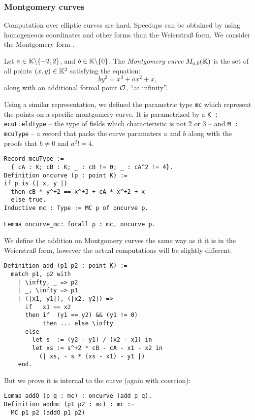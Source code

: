 \subsubsection{Montgomery curves}
\label{montgomery}
Computation over elliptic curves are hard. Speedups can be obtained by using
homogeneous coordinates and other forms than the Weierstra{\ss} form. We consider
the Montgomery form \cite{MontgomerySpeeding}.

\begin{definition}
  Let $a \in \mathbb{K} \backslash \{-2, 2\}$, and $b \in \mathbb{K} \backslash \{ 0\}$. The \textit{Montgomery curve} $M_{a,b}(\mathbb{K})$ is the set of all points $(x,y) \in \mathbb{K}^2$ satisfying the equation:
  $$by^2 = x^3 + ax^2 + x,$$
  along with an additional formal point $\mathcal{O}$, ``at infinity''.
\end{definition}

Using a similar representation, we defined the parametric type \texttt{mc} which
represent the points on a specific montgomery curve. It is parametrized by
a \texttt{K : ecuFieldType} -- the type of fields which characteristic is not 2 or 3 --
and \texttt{M : mcuType} -- a record that packs the curve paramaters $a$ and $b$
along with the proofs that $b \neq 0$ and $a^2 != 4$.
\begin{lstlisting}[language=Coq]
Record mcuType :=
  { cA : K; cB : K; _ : cB != 0; _ : cA^2 != 4}.
Definition oncurve (p : point K) :=
if p is (| x, y |)
  then cB * y^+2 == x^+3 + cA * x^+2 + x
  else true.
Inductive mc : Type := MC p of oncurve p.

Lemma oncurve_mc: forall p : mc, oncurve p.
\end{lstlisting}

We define the addition on Montgomery curves the same way as it it is in the Weierstra{\ss} form,
however the actual computations will be slightly different.
\begin{lstlisting}[language=Coq]
Definition add (p1 p2 : point K) :=
  match p1, p2 with
    | \infty, _ => p2
    | _, \infty => p1
    | (|x1, y1|), (|x2, y2|) =>
      if   x1 == x2
      then if  (y1 == y2) && (y1 != 0)
           then ... else \infty
      else
        let s  := (y2 - y1) / (x2 - x1) in
        let xs := s^+2 * cB - cA - x1 - x2 in
          (| xs, - s * (xs - x1) - y1 |)
    end.
\end{lstlisting}

But we prove it is internal to the curve (again with coercion):
\begin{lstlisting}[language=Coq]
Lemma addO (p q : mc) : oncurve (add p q).
Definition addmc (p1 p2 : mc) : mc :=
  MC p1 p2 (addO p1 p2)
\end{lstlisting}

